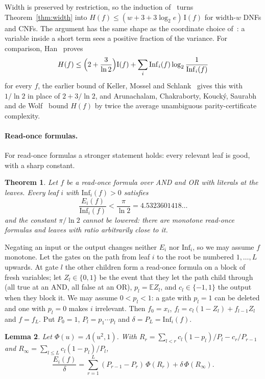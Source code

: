 \documentclass[11pt]{amsart}
\newtheorem{theorem}{Theorem}[section]
\newtheorem{lemma}[theorem]{Lemma}
\theoremstyle{definition}
\theoremstyle{remark}
\newcommand{\Inf}{\mathrm{Inf}}
\newcommand{\E}{\mathbb{E}}
\begin{document}
Width is preserved by restriction, so the induction of~\cite{Shm2} turns Theorem~\ref{thm:width} into
$H(f)\le(w+3+3\log_2e)\,\mathrm I(f)$ for width-$w$ DNFs and CNFs. The argument has the same shape as the
coordinate choice of~\cite[Section~5.2]{GMP}: a variable inside a short term sees a positive fraction of the
variance. For comparison, Han~\cite{Han} proves
\[
H(f)\le\Bigl(2+\frac{3}{\ln 2}\Bigr)\mathrm I(f)+\sum_i\Inf_i(f)\log_2\frac{1}{\Inf_i(f)}
\]
for every $f$, the earlier bound of Keller, Mossel and Schlank~\cite[Claim~4.1]{KMS} gives this with $1/\ln 2$ in place of $2+3/\ln 2$, and Arunachalam, Chakraborty, Kouck\'y, Saurabh and de Wolf~\cite{ACKSW} bound $H(f)$ by twice the
average unambiguous parity-certificate complexity.

\paragraph{Read-once formulas.}
For read-once formulas a stronger statement holds: every relevant leaf is good, with a sharp constant.

\begin{theorem}\label{thm:readonce}
Let $f$ be a read-once formula over AND and OR with literals at the leaves. Every leaf $i$ with $\Inf_i(f)>0$
satisfies
\[
\frac{E_i(f)}{\Inf_i(f)}<\frac{\pi}{\ln 2}=4.5323601418\dots
\]
and the constant $\pi/\ln 2$ cannot be lowered: there are monotone read-once formulas and leaves with ratio
arbitrarily close to it.
\end{theorem}

Negating an input or the output changes neither $E_i$ nor $\Inf_i$, so we may assume $f$ monotone. Let the gates on
the path from leaf $i$ to the root be numbered $1,\dots,L$ upwards. At gate $l$ the other children form a read-once
formula on a block of fresh variables; let $Z_l\in\{0,1\}$ be the event that they let the path child through
(all true at an AND, all false at an OR), $p_l=\E Z_l$, and $c_l\in\{-1,1\}$ the output when they block it. We may
assume $0<p_l<1$: a gate with $p_l=1$ can be deleted and one with $p_l=0$ makes $i$ irrelevant. Then
$f_0=x_i$, $f_l=c_l(1-Z_l)+f_{l-1}Z_l$ and $f=f_L$. Put $P_0=1$, $P_l=p_1\cdots p_l$ and $\delta=P_L=\Inf_i(f)$.

\begin{lemma}\label{lem:path}
Let $\Phi(u)=\Lambda(u^2,1)$. With
$R_r=\sum_{l<r}c_l(1-p_l)/P_l-c_r/P_{r-1}$ and $R_\infty=\sum_{l\le L}c_l(1-p_l)/P_l$,
\[
\frac{E_i(f)}{\delta}=\sum_{r=1}^L(P_{r-1}-P_r)\,\Phi(R_r)+\delta\,\Phi(R_\infty).
\]
\end{lemma}
\end{document}
